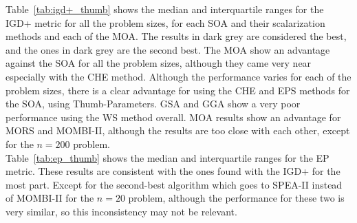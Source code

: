 Table~\ref{tab:igd+_thumb} shows the median and interquartile ranges for the IGD+ metric for all the problem sizes, for each SOA and their scalarization methods and each of the MOA. The results in dark grey are considered the best, and the ones in dark grey are the second best. The MOA show an advantage against the SOA for all the problem sizes, although they came very near especially with the CHE method. Although the performance varies for each of the problem sizes, there is a clear advantage for using the CHE and EPS methods for the SOA, using Thumb-Parameters. GSA and GGA show a very poor performance using the WS method overall. MOA results show an advantage for MORS and MOMBI-II, although the results are too close with each other, except for the $n = 200$ problem.\\

Table~\ref{tab:ep_thumb} shows the median and interquartile ranges for the EP metric. These results are consistent with the ones found with the IGD+ for the most part. Except for the second-best algorithm which goes to SPEA-II instead of MOMBI-II for the $n = 20$ problem, although the performance for these two is very similar, so this inconsistency may not be relevant.\\


